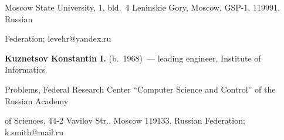 Moscow State University, 1, bld.~4 Leninskie Gory, Moscow, GSP-1, 119991, Russian 


Federation; \mbox{levehr@yandex.ru}





\vspace*{6pt}





\noindent


\textbf{Kuznetsov Konstantin I.} (b.\ 1968)~--- leading engineer, Institute of Informatics 


Problems, Federal Research Center ``Computer Science and Control'' of the Russian Academy 


of Sciences, 44-2 Vavilov Str., Moscow 119133, Russian Federation; \mbox{k.smith@mail.ru}


\label{end\stat}





\renewcommand{\bibname}{\protect\rm Литература} 


 





 



